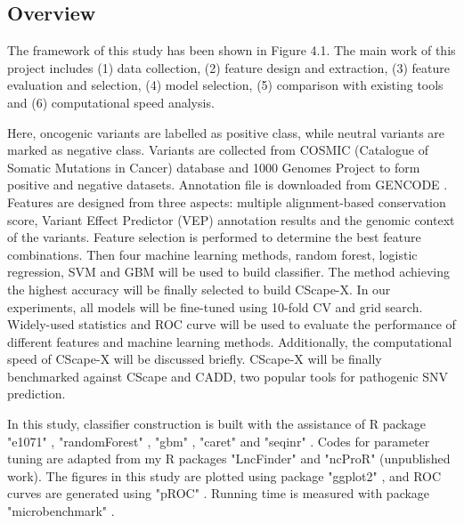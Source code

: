 \documentclass[a4paper,nohyper,nobib,openany,justified]{tufte-book}
\begin{document}
\begin{fullwidth}
\chapter{Overview}

The framework of this study has been shown in Figure 4.1. The main work of this project includes (1) data collection, (2) feature design and extraction, (3) feature evaluation and selection, (4) model selection, (5) comparison with existing tools and (6) computational speed analysis.

Here, oncogenic variants are labelled as positive class, while neutral variants are marked as negative class. Variants are collected from COSMIC (Catalogue of Somatic Mutations in Cancer) database \cite{Tate2019} and 1000 Genomes Project \cite{1000GenomesProjectConsortium2015} to form positive and negative datasets. Annotation file is downloaded from GENCODE \cite{Harrow2012}. Features are designed from three aspects: multiple alignment-based conservation score, Variant Effect Predictor (VEP) annotation results and the genomic context of the variants. Feature selection is performed to determine the best feature combinations. Then four machine learning methods, random forest, logistic regression, SVM and GBM will be used to build classifier. The method achieving the highest accuracy will be finally selected to build CScape-X. In our experiments, all models will be fine-tuned using 10-fold CV and grid search. Widely-used statistics and ROC curve will be used to evaluate the performance of different features and machine learning methods. Additionally, the computational speed of CScape-X will be discussed briefly. CScape-X will be finally benchmarked against CScape and CADD, two popular tools for pathogenic SNV prediction.

In this study, classifier construction is built with the assistance of R package "e1071" \cite{David2017, Chang2011}, "randomForest" \cite{Liaw2002}, "gbm" \cite{Greenwell2019}, "caret" \cite{Bellucci2011} and "seqinr" \cite{Charif2007}. Codes for parameter tuning are adapted from my R packages "LncFinder" \cite{Han2018} and "ncProR" (unpublished work). The figures in this study are plotted using package "ggplot2" \cite{Wickham2009}, and ROC curves are generated using "pROC" \cite{Robin2011}. Running time is measured with package "microbenchmark" \cite{Mersmann2018}.


\end{fullwidth}
\end{document}

